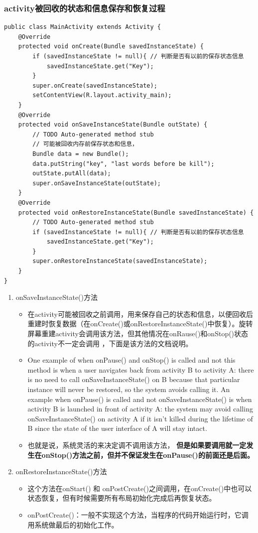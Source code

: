 \documentclass[9pt, b5paper]{article}
\begin{document}
\subsubsection{activity被回收的状态和信息保存和恢复过程}
\label{sec-1-2-1}
\begin{verbatim}
public class MainActivity extends Activity {
    @Override
    protected void onCreate(Bundle savedInstanceState) {
        if (savedInstanceState != null){ // 判断是否有以前的保存状态信息
            savedInstanceState.get("Key"); 
        }
        super.onCreate(savedInstanceState);
        setContentView(R.layout.activity_main);
    }
    @Override
    protected void onSaveInstanceState(Bundle outState) {
        // TODO Auto-generated method stub
        // 可能被回收内存前保存状态和信息，
        Bundle data = new Bundle(); 
        data.putString("key", "last words before be kill");
        outState.putAll(data);
        super.onSaveInstanceState(outState);
    }
    @Override
    protected void onRestoreInstanceState(Bundle savedInstanceState) {
        // TODO Auto-generated method stub
        if (savedInstanceState != null){ // 判断是否有以前的保存状态信息
            savedInstanceState.get("Key"); 
        }
        super.onRestoreInstanceState(savedInstanceState);
    }
}
\end{verbatim}
\begin{enumerate}
\item onSaveInstanceState()方法
\label{sec-1-2-1-1}
\begin{itemize}
\item 在activity可能被回收之前调用，用来保存自己的状态和信息，以便回收后重建时恢复数据（在onCreate()或onRestoreInstanceState()中恢复）。旋转屏幕重建activity会调用该方法，但其他情况在onRause()和onStop()状态的activity不一定会调用 ，下面是该方法的文档说明。
\item One example of when onPause() and onStop() is called and not this method is when a user navigates back from activity B to activity A: there is no need to call onSaveInstanceState() on B because that particular instance will never be restored, so the system avoids calling it. An example when onPause() is called and not onSaveInstanceState() is when activity B is launched in front of activity A: the system may avoid calling onSaveInstanceState() on activity A if it isn't killed during the lifetime of B since the state of the user interface of A will stay intact.
\item 也就是说，系统灵活的来决定调不调用该方法， \textbf{但是如果要调用就一定发生在onStop()方法之前，但并不保证发生在onPause()的前面还是后面。}
\end{itemize}
\item onRestoreInstanceState()方法
\label{sec-1-2-1-2}
\begin{itemize}
\item 这个方法在onStart() 和 onPostCreate()之间调用，在onCreate()中也可以状态恢复，但有时候需要所有布局初始化完成后再恢复状态。
\item onPostCreate()：一般不实现这个方法，当程序的代码开始运行时，它调用系统做最后的初始化工作。
\end{itemize}
\end{enumerate}
\end{document}
